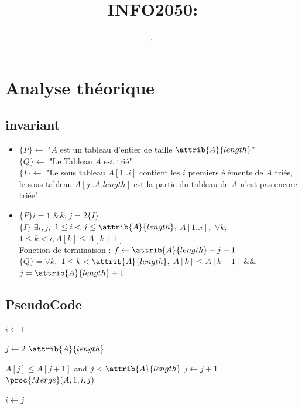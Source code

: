 \documentclass[a4paper, 11pt, oneside]{article}
\title{INFO2050: \intitule}
\author{\PrenomUN~\textsc{\NomUN}, \PrenomDEUX~\textsc{\NomDEUX}}
\date{}
\begin{document}
\maketitle
\newpage


	\section{Analyse théorique}
	\subsection{invariant}
	\begin{itemize}[label=$\square$]

\item

	\noindent $\{P\} \gets$ "$A$ est un tableau d'entier de taille $\attrib{A}{length}"$\\
	  $\{Q\} \gets$ "Le Tableau $A$ est trié"\\ 
	$\{I\} \gets$ "Le sous tableau 
$A[1..i]$ contient les $i$ premiers éléments de $A$ triés, le sous tableau \indent \indent $A[j..A.length]$ est la partie du tableau de $A$ n'est pas encore triée"

\item $\{P\} i = 1$ $\&\&$ $j = 2 \{I\}$
\\ $\{I\}$  $\exists i,j,$ $1 \leq i < j \leq \attrib{A}{length},$  $A[1..i],$ $\forall k,$ $1 \leq k < i, A[k] \leq A[k+1]$ \\
\indent Fonction de terminaison : $f \gets \attrib{A}{length}-j +1$
\\ $\{Q\} = \forall k,$ $1 \leq k < \attrib{A}{length},$ $A[k] \leq A[k+1]$ $\&\&$ $j=\attrib{A}{length}+1$

\end{itemize}

	\subsection{PseudoCode}
	\label{PseudoCode}
	
	\begin{codebox}
\li $i \gets 1$

\li \For $j \gets 2$ \To $\attrib{A}{length}$
\Do

\li \While $A[j] \leq A[j+1]$ and $j < \attrib{A}{length}$
\li \Do
$j \gets j + 1$
\End
\li $\proc{Merge}(A, 1, i, j)$

\li $i \gets j$
\End
\end{codebox}
\end{document}
